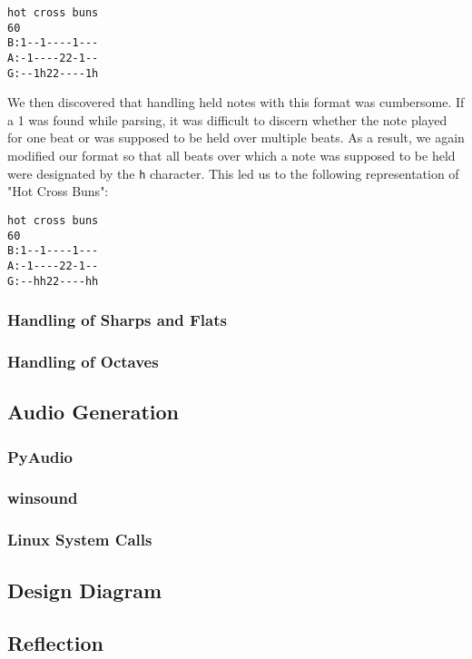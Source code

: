 \documentclass[12pt, letterpaper]{article}
\begin{document}
\begin{verbatim}
hot cross buns
60
B:1--1----1---
A:-1----22-1--
G:--1h22----1h
\end{verbatim}

We then discovered that handling held notes with this format was cumbersome. If a 1 was found while parsing, it was difficult to discern whether the note played for one beat or was supposed to be held over multiple beats. As a result, we again modified our format so that all beats over which a note was supposed to be held were designated by the \texttt{h} character. This led us to the following representation of "Hot Cross Buns":

\begin{verbatim}
hot cross buns
60
B:1--1----1---
A:-1----22-1--
G:--hh22----hh
\end{verbatim}
            
\subsubsection{Handling of Sharps and Flats}
\subsubsection{Handling of Octaves}

\subsection{Audio Generation}

\subsubsection{PyAudio}
\subsubsection{winsound}
\subsubsection{Linux System Calls}

\subsection{Design Diagram}

\subsection{Reflection}
\end{document}
